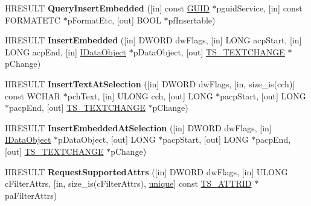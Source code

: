 \begin{DoxyCompactItemize}
\item 
\mbox{\label{interface_i_text_store_a_c_p_a043363ac764495b98c95d1656f8d32fe}} 
H\+R\+E\+S\+U\+LT {\bfseries Query\+Insert\+Embedded} (\mbox{[}in\mbox{]} const \hyperlink{interface_g_u_i_d}{G\+U\+ID} $\ast$pguid\+Service, \mbox{[}in\mbox{]} const F\+O\+R\+M\+A\+T\+E\+TC $\ast$p\+Format\+Etc, \mbox{[}out\mbox{]} B\+O\+OL $\ast$pf\+Insertable)
\item 
\mbox{\label{interface_i_text_store_a_c_p_a7f4714f8af0a1b6fd62275cbb516bca5}} 
H\+R\+E\+S\+U\+LT {\bfseries Insert\+Embedded} (\mbox{[}in\mbox{]} D\+W\+O\+RD dw\+Flags, \mbox{[}in\mbox{]} L\+O\+NG acp\+Start, \mbox{[}in\mbox{]} L\+O\+NG acp\+End, \mbox{[}in\mbox{]} \hyperlink{interface_i_data_object}{I\+Data\+Object} $\ast$p\+Data\+Object, \mbox{[}out\mbox{]} \hyperlink{struct_t_s___t_e_x_t_c_h_a_n_g_e}{T\+S\+\_\+\+T\+E\+X\+T\+C\+H\+A\+N\+GE} $\ast$p\+Change)
\item 
\mbox{\label{interface_i_text_store_a_c_p_a35c98c7f2e1a3dd38d7ed5a7cfdf6523}} 
H\+R\+E\+S\+U\+LT {\bfseries Insert\+Text\+At\+Selection} (\mbox{[}in\mbox{]} D\+W\+O\+RD dw\+Flags, \mbox{[}in, size\+\_\+is(cch)\mbox{]} const W\+C\+H\+AR $\ast$pch\+Text, \mbox{[}in\mbox{]} U\+L\+O\+NG cch, \mbox{[}out\mbox{]} L\+O\+NG $\ast$pacp\+Start, \mbox{[}out\mbox{]} L\+O\+NG $\ast$pacp\+End, \mbox{[}out\mbox{]} \hyperlink{struct_t_s___t_e_x_t_c_h_a_n_g_e}{T\+S\+\_\+\+T\+E\+X\+T\+C\+H\+A\+N\+GE} $\ast$p\+Change)
\item 
\mbox{\label{interface_i_text_store_a_c_p_a2f213557e339bda67876eb410a068254}} 
H\+R\+E\+S\+U\+LT {\bfseries Insert\+Embedded\+At\+Selection} (\mbox{[}in\mbox{]} D\+W\+O\+RD dw\+Flags, \mbox{[}in\mbox{]} \hyperlink{interface_i_data_object}{I\+Data\+Object} $\ast$p\+Data\+Object, \mbox{[}out\mbox{]} L\+O\+NG $\ast$pacp\+Start, \mbox{[}out\mbox{]} L\+O\+NG $\ast$pacp\+End, \mbox{[}out\mbox{]} \hyperlink{struct_t_s___t_e_x_t_c_h_a_n_g_e}{T\+S\+\_\+\+T\+E\+X\+T\+C\+H\+A\+N\+GE} $\ast$p\+Change)
\item 
\mbox{\label{interface_i_text_store_a_c_p_a72c090c255c3139ba5bbfd15d1e4b0c9}} 
H\+R\+E\+S\+U\+LT {\bfseries Request\+Supported\+Attrs} (\mbox{[}in\mbox{]} D\+W\+O\+RD dw\+Flags, \mbox{[}in\mbox{]} U\+L\+O\+NG c\+Filter\+Attrs, \mbox{[}in, size\+\_\+is(c\+Filter\+Attrs), \hyperlink{interfaceunique}{unique}\mbox{]} const \hyperlink{interface_g_u_i_d}{T\+S\+\_\+\+A\+T\+T\+R\+ID} $\ast$pa\+Filter\+Attrs)

\end{DoxyCompactItemize}

